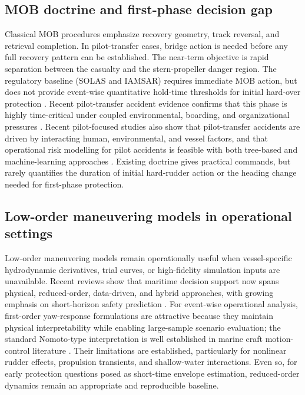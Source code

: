 \documentclass[preprint,12pt]{elsarticle}
\begin{document}
\subsection{MOB doctrine and first-phase decision gap}
Classical MOB procedures emphasize recovery geometry, track reversal, and retrieval completion. In pilot-transfer cases, bridge action is needed before any full recovery pattern can be established. The near-term objective is rapid separation between the casualty and the stern-propeller danger region. The regulatory baseline (SOLAS and IAMSAR) requires immediate MOB action, but does not provide event-wise quantitative hold-time thresholds for initial hard-over protection \cite{ref_solas,ref_iamsar}. Recent pilot-transfer accident evidence confirms that this phase is highly time-critical under coupled environmental, boarding, and organizational pressures \cite{ref_pilot_transfer_accidents}. Recent pilot-focused studies also show that pilot-transfer accidents are driven by interacting human, environmental, and vessel factors, and that operational risk modelling for pilot accidents is feasible with both tree-based and machine-learning approaches \cite{ref_camliyurt_pilot_fta2022,ref_camliyurt_pilot_ml2023}. Existing doctrine gives practical commands, but rarely quantifies the duration of initial hard-rudder action or the heading change needed for first-phase protection.

\subsection{Low-order maneuvering models in operational settings}
Low-order maneuvering models remain operationally useful when vessel-specific hydrodynamic derivatives, trial curves, or high-fidelity simulation inputs are unavailable. Recent reviews show that maritime decision support now spans physical, reduced-order, data-driven, and hybrid approaches, with growing emphasis on short-horizon safety prediction \cite{ref_ship_motion_review,ref_ship_motion_review2}. For event-wise operational analysis, first-order yaw-response formulations are attractive because they maintain physical interpretability while enabling large-sample scenario evaluation; the standard Nomoto-type interpretation is well established in marine craft motion-control literature \cite{ref_fossen}. Their limitations are established, particularly for nonlinear rudder effects, propulsion transients, and shallow-water interactions. Even so, for early protection questions posed as short-time envelope estimation, reduced-order dynamics remain an appropriate and reproducible baseline.
\end{document}
